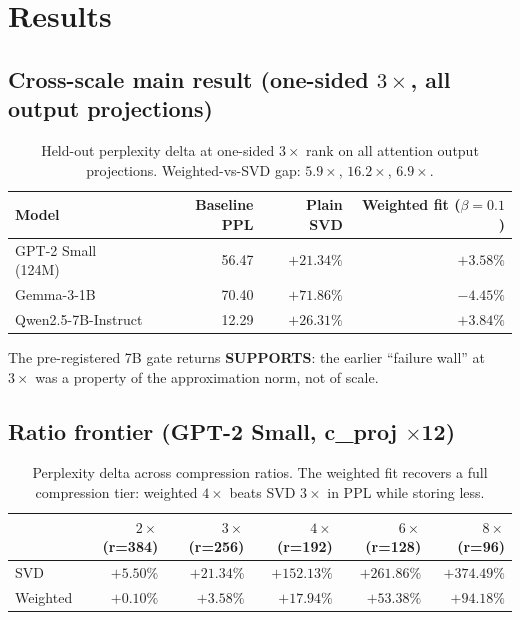 \documentclass[11pt]{article}
\begin{document}
\section{Results}\label{sec:results}

\subsection{Cross-scale main result (one-sided $3\times$, all output projections)}

\begin{table}[h]
\centering
\begin{tabular}{lrrr}
\toprule
Model & Baseline PPL & Plain SVD & Weighted fit ($\beta=0.1$) \\
\midrule
GPT-2 Small (124M)      & 56.47 & $+21.34\%$ & $\mathbf{+3.58\%}$ \\
Gemma-3-1B              & 70.40 & $+71.86\%$ & $\mathbf{-4.45\%}$ \\
Qwen2.5-7B-Instruct     & 12.29 & $+26.31\%$ & $\mathbf{+3.84\%}$ \\
\bottomrule
\end{tabular}
\caption{Held-out perplexity delta at one-sided $3\times$ rank on all
attention output projections. Weighted-vs-SVD gap: $5.9\times$,
$16.2\times$, $6.9\times$.}
\label{tab:main}
\end{table}

The pre-registered 7B gate returns \textbf{SUPPORTS}: the earlier
``failure wall'' at $3\times$ was a property of the approximation norm, not
of scale.

\subsection{Ratio frontier (GPT-2 Small, c\_proj $\times$12)}

\begin{table}[h]
\centering
\begin{tabular}{lrrrrr}
\toprule
& $2\times$ (r=384) & $3\times$ (r=256) & $4\times$ (r=192) & $6\times$ (r=128) & $8\times$ (r=96) \\
\midrule
SVD      & $+5.50\%$  & $+21.34\%$ & $+152.13\%$ & $+261.86\%$ & $+374.49\%$ \\
Weighted & $\mathbf{+0.10\%}$ & $\mathbf{+3.58\%}$ & $\mathbf{+17.94\%}$ & $+53.38\%$ & $+94.18\%$ \\
\bottomrule
\end{tabular}
\caption{Perplexity delta across compression ratios. The weighted fit
recovers a full compression tier: weighted $4\times$ beats SVD $3\times$ in
PPL while storing less.}
\label{tab:frontier}
\end{table}
\end{document}
